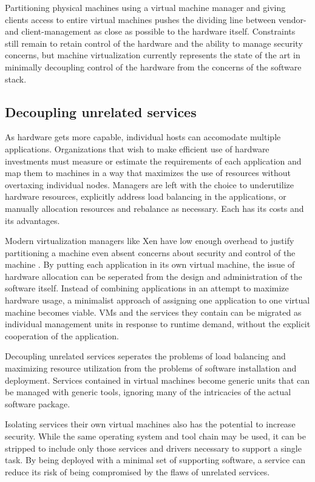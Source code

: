 Partitioning physical machines using a virtual machine manager and giving clients access to entire virtual machines pushes the dividing line between vendor- and client-management as close as possible to the hardware itself. Constraints still remain to retain control of the hardware and the ability to manage security concerns, but machine virtualization currently represents the state of the art in minimally decoupling control of the hardware from the concerns of the software stack.

\subsection{Decoupling unrelated services}

As hardware gets more capable, individual hosts can accomodate multiple applications. Organizations that wish to make efficient use of hardware investments must measure or estimate the requirements of each application and map them to machines in a way that maximizes the use of resources without overtaxing individual nodes. Managers are left with the choice to underutilize hardware resources, explicitly address load balancing in the applications, or manually allocation resources and rebalance as necessary. Each has its costs and its advantages.

Modern virtualization managers like Xen have low enough overhead to justify partitioning a machine even absent concerns about security and control of the machine \cite{barham}. By putting each application in its own virtual machine, the issue of hardware allocation can be seperated from the design and administration of the software itself. Instead of combining applications in an attempt to maximize hardware usage, a minimalist approach of assigning one application to one virtual machine becomes viable. VMs and the services they contain can be migrated as individual management units in response to runtime demand, without the explicit cooperation of the application.

Decoupling unrelated services seperates the problems of load balancing and maximizing resource utilization from the problems of software installation and deployment. Services contained in virtual machines become generic units that can be managed with generic tools, ignoring many of the intricacies of the actual software package.

Isolating services their own virtual machines also has the potential to increase security. While the same operating system and tool chain may be used, it can be stripped to include only those services and drivers necessary to support a single task. By being deployed with a minimal set of supporting software, a service can reduce its risk of being compromised by the flaws of unrelated services.

